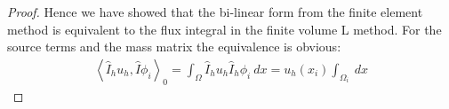 \documentclass[../Main/main.tex]{subfiles}
\begin{document}
\begin{proof}
		Hence we have showed that the bi-linear form from the finite element method is equivalent to the flux integral in the finite volume L method. For the source terms and the mass matrix the equivalence is obvious:
		\begin{equation}
			\begin{aligned}
				\left \langle \hat{I}_h  u_h,\hat{I}\phi_i \right \rangle_0 = \int_{\Omega}\hat{I}_h u_h \hat{I}_h \phi_i \ dx = u_h(x_i) \int_{\Omega_i} \ dx
			\end{aligned}
		\end{equation}
	\end{proof}

	
\end{document}
